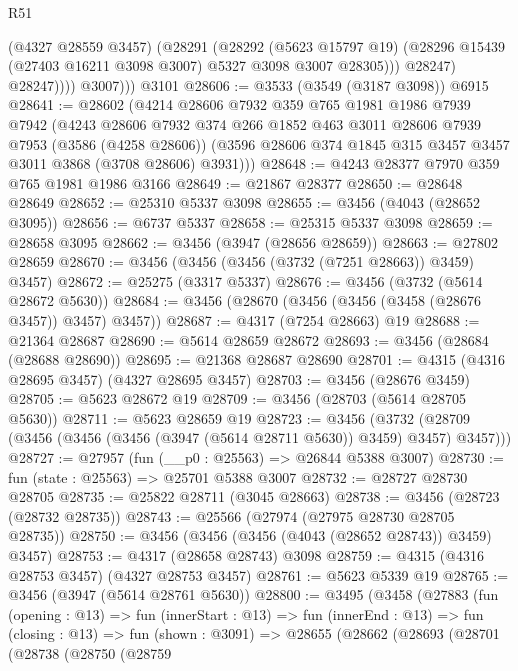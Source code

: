 \begin{lexlean}{R51}
\begin{coremodule}
                  (@4327 @28559 @3457)
                  (@28291
                    (@28292
                      (@5623 @15797 @19)
                      (@28296 @15439 (@27403 @16211 @3098 @3007) @5327 @3098 @3007 @28305)))
                  @28247)
                @28247))))
          @3007)))
    @3101
@28606 := @3533 (@3549 (@3187 @3098)) @6915
@28641 := @28602
    (@4214
      @28606
      @7932
      @359
      @765
      @1981
      @1986
      @7939
      @7942
      (@4243
        @28606
        @7932
        @374
        @266
        @1852
        @463
        @3011
        @28606
        @7939
        @7953
        (@3586 (@4258 @28606))
        (@3596 @28606 @374 @1845 @315 @3457 @3457 @3011 @3868 (@3708 @28606) @3931)))
@28648 := @4243 @28377 @7970 @359 @765 @1981 @1986 @3166
@28649 := @21867 @28377
@28650 := @28648 @28649
@28652 := @25310 @5337 @3098
@28655 := @3456 (@4043 (@28652 @3095))
@28656 := @6737 @5337
@28658 := @25315 @5337 @3098
@28659 := @28658 @3095
@28662 := @3456 (@3947 (@28656 @28659))
@28663 := @27802 @28659
@28670 := @3456 (@3456 (@3456 (@3732 (@7251 @28663)) @3459) @3457)
@28672 := @25275 (@3317 @5337)
@28676 := @3456 (@3732 (@5614 @28672 @5630))
@28684 := @3456 (@28670 (@3456 (@3456 (@3458 (@28676 @3457)) @3457) @3457))
@28687 := @4317 (@7254 @28663) @19
@28688 := @21364 @28687
@28690 := @5614 @28659 @28672
@28693 := @3456 (@28684 (@28688 @28690))
@28695 := @21368 @28687 @28690
@28701 := @4315 (@4316 @28695 @3457) (@4327 @28695 @3457)
@28703 := @3456 (@28676 @3459)
@28705 := @5623 @28672 @19
@28709 := @3456 (@28703 (@5614 @28705 @5630))
@28711 := @5623 @28659 @19
@28723 := @3456
    (@3732 (@28709 (@3456 (@3456 (@3456 (@3947 (@5614 @28711 @5630)) @3459) @3457) @3457)))
@28727 := @27957 (fun (__p0 : @25563) => @26844 @5388 @3007)
@28730 := fun (state : @25563) => @25701 @5388 @3007
@28732 := @28727 @28730 @28705
@28735 := @25822 @28711 (@3045 @28663)
@28738 := @3456 (@28723 (@28732 @28735))
@28743 := @25566 (@27974 (@27975 @28730 @28705 @28735))
@28750 := @3456 (@3456 (@3456 (@4043 (@28652 @28743)) @3459) @3457)
@28753 := @4317 (@28658 @28743) @3098
@28759 := @4315 (@4316 @28753 @3457) (@4327 @28753 @3457)
@28761 := @5623 @5339 @19
@28765 := @3456 (@3947 (@5614 @28761 @5630))
@28800 := @3495
    (@3458
      (@27883
        (fun (opening : @13) =>
        fun (innerStart : @13) =>
        fun (innerEnd : @13) =>
        fun (closing : @13) =>
        fun (shown : @3091) =>
        @28655
          (@28662
            (@28693
              (@28701
                (@28738
                  (@28750
                    (@28759

\end{coremodule}
\end{lexlean}

